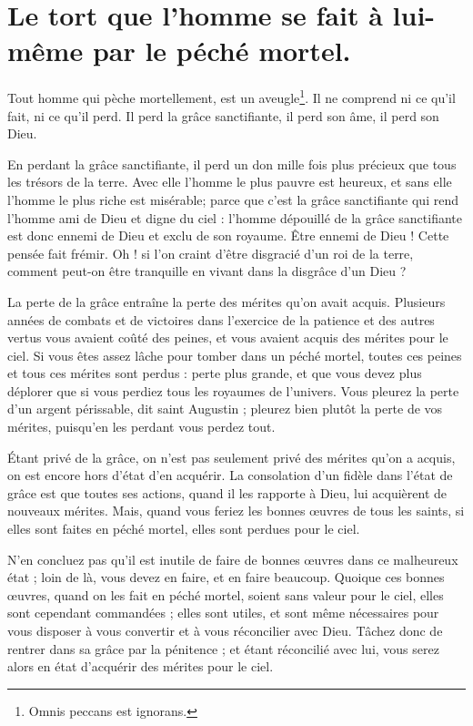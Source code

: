 \documentclass[instructions.tex]{subfiles}
\begin{document}
\chapter{Le tort que l’homme se fait à lui-même par le péché mortel.}


Tout homme qui pèche mortellement, est un aveugle\footnote{Omnis peccans est ignorans.}. Il ne comprend ni ce qu’il fait, ni ce qu’il perd. Il perd la grâce sanctifiante, il perd son âme, il perd son Dieu.


\primo En perdant la grâce sanctifiante, il perd un don mille fois plus précieux que tous les trésors de la terre. Avec elle l’homme le plus pauvre est heureux, et sans elle l’homme le plus riche est misérable; parce que c’est la grâce sanctifiante qui rend l’homme ami de Dieu et digne du ciel : l’homme dépouillé de la grâce sanctifiante est donc ennemi de Dieu et exclu de son royaume. Être ennemi de Dieu ! Cette pensée fait frémir. Oh ! si l’on craint d’être disgracié d’un roi de la terre, comment peut-on être tranquille en vivant dans la disgrâce d’un Dieu ?

\secundo La perte de la grâce entraîne la perte des mérites qu’on avait acquis. Plusieurs années de combats et de victoires dans l’exercice de la patience et des autres vertus vous avaient coûté des peines, et vous avaient acquis des mérites pour le ciel. Si vous êtes assez lâche pour tomber dans un péché mortel, toutes ces peines et tous ces mérites sont perdus : perte plus grande, et que vous devez plus déplorer que si vous perdiez tous les royaumes de l’univers. Vous pleurez la perte d’un argent périssable, dit saint Augustin ; pleurez bien plutôt la perte de vos mérites, puisqu’en les perdant vous perdez tout.

\tertio Étant privé de la grâce, on n’est pas seulement privé des mérites qu’on a acquis, on est encore hors d’état d’en acquérir. La consolation d’un fidèle dans l’état de grâce est que toutes ses actions, quand il les rapporte à Dieu, lui acquièrent de nouveaux mérites. Mais, quand vous feriez les bonnes œuvres de tous les saints, si elles sont faites en péché mortel, elles sont perdues pour le ciel.

N’en concluez pas qu’il est inutile de faire de bonnes œuvres dans ce malheureux état ; loin de là, vous devez en faire, et en faire beaucoup. Quoique ces bonnes œuvres, quand on les fait en péché mortel, soient sans valeur pour le ciel, elles sont cependant commandées ; elles sont utiles, et sont même nécessaires pour vous disposer à vous convertir et à vous réconcilier avec Dieu. Tâchez donc de rentrer dans sa grâce par la pénitence ; et étant réconcilié avec lui, vous serez alors en état d’acquérir des mérites pour le ciel.
\end{document}
